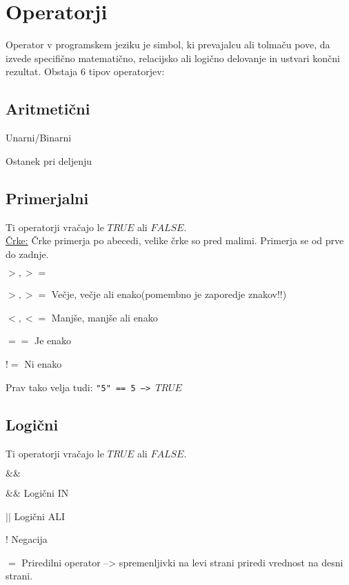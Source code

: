 \section{Operatorji}

Operator v programskem jeziku je simbol, ki prevajalcu ali tolmaču pove, da izvede specifično matematično, relacijsko ali logično delovanje in ustvari končni rezultat. Obstaja 6 tipov operatorjev:

\subsection{Aritmetični}

\begin{description}[align=left,labelwidth=3cm]
	\item[$+, -$] Unarni/Binarni
	\item[$\times, \div$]
	\item[$\%$] Ostanek pri deljenju
\end{description}

\subsection{Primerjalni}
Ti operatorji vračajo le $TRUE$ ali $FALSE$.\\
\underline{Črke:}
Črke primerja po abecedi, velike črke so pred malimi. Primerja se od prve do zadnje.

\begin{labeling}{$>, >=$}
	\item [$>, >=$]	Večje, večje ali enako(pomembno je zaporedje znakov!!)
	\item [$<, <=$]	Manjše, manjše ali enako
	\item [$==$] Je enako	
	\item [$!=$] Ni enako
\end{labeling} 

Prav tako velja tudi: \texttt{"5"~==~5 --> $TRUE$}



\subsection{Logični}

Ti operatorji vračajo le $TRUE$ ali $FALSE$.\

\begin{labeling}{$\&\&$}
	\item [$\&\&$] Logični IN
	\item [$||$] Logični ALI
	\item [$!$] Negacija
	\item [$=$] Priredilni operator --> spremenljivki na levi strani priredi vrednost na desni strani.
\end{labeling}
\pagebreak

